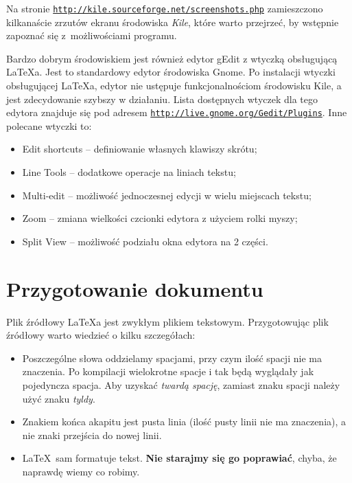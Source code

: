 Na stronie \underline{\texttt{http://kile.sourceforge.net/screenshots.php}} zamieszczono kilkanaście zrzutów ekranu środowiska {\em Kile}, które warto przejrzeć, by wstępnie zapoznać się z~możliwościami programu.

Bardzo dobrym środowiskiem jest również edytor gEdit z wtyczką obsługującą \LaTeX a. Jest to standardowy edytor środowiska Gnome. Po instalacji wtyczki obsługującej \LaTeX a, edytor nie ustępuje funkcjonalnościom środowisku Kile, a jest zdecydowanie szybszy w działaniu. Lista dostępnych wtyczek dla tego edytora znajduje się pod adresem \underline{\texttt{http://live.gnome.org/Gedit/Plugins}}. Inne polecane wtyczki to: 
\begin{itemize}
\item Edit shortcuts -- definiowanie własnych klawiszy skrótu;
\item Line Tools -- dodatkowe operacje na liniach tekstu;
\item Multi-edit -- możliwość jednoczesnej edycji w wielu miejscach tekstu;
\item Zoom -- zmiana wielkości czcionki edytora z użyciem rolki myszy;
\item Split View -- możliwość podziału okna edytora na 2 części. 
\end{itemize}




\section{Przygotowanie dokumentu}
\label{sec:przygotowanieDokumentu}

Plik źródłowy \LaTeX a jest zwykłym plikiem tekstowym. Przygotowując plik
źródłowy warto wiedzieć o kilku szczegółach:

\begin{itemize}
\item
Poszczególne słowa oddzielamy spacjami, przy czym ilość spacji nie ma znaczenia.
Po kompilacji wielokrotne spacje i tak będą wyglądały jak pojedyncza spacja.
Aby uzyskać {\em twardą spację}, zamiast znaku spacji należy użyć znaku {\em
tyldy}.

\item
Znakiem końca akapitu jest pusta linia (ilość pusty linii nie ma znaczenia), a
nie znaki przejścia do nowej linii.

\item
\LaTeX~sam formatuje tekst. \textbf{Nie starajmy się go poprawiać}, chyba, że
naprawdę wiemy co robimy.
\end{itemize} 


